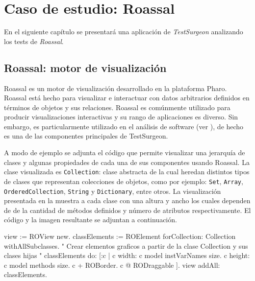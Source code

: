 \chapter{Caso de estudio: Roassal}


\par En el siguiente capítulo se presentará una aplicación de \emph{TestSurgeon} analizando los tests de \emph{Roassal}. 

\section{Roassal: motor de visualización}

\par Roassal es un motor de visualización desarrollado en la plataforma Pharo. Roassal está hecho para visualizar e interactuar con datos arbitrarios definidos en términos de objetos y sus relaciones. Roassal es comúnmente utilizado para producir visualizaciones interactivas y su rango de aplicaciones es diverso. Sin embargo, es particularmente utilizado en el análisis de software (ver ), de hecho es una de las componentes principales de TestSurgeon.

\par A modo de ejemplo se adjunta el código que permite visualizar una jerarquía de clases y algunas propiedades de cada una de sus componentes usando Roassal. La clase visualizada es {\tt Collection}: clase abstracta de la cual heredan distintos tipos de clases que representan colecciones de objetos, como por ejemplo: {\tt Set}, {\tt Array}, {\tt OrderedCollection}, {\tt String} y {\tt Dictionary}, entre otros. La visualización presentada en la  muestra a cada clase con una altura y ancho los cuales dependen de de la cantidad de métodos definidos y número de atributos respectivamente. El código y la imagen resultante se adjuntan a continuación.\\

\begin{code}
view := ROView new.
classElements := ROElement forCollection:
	Collection withAllSubclasses.
" Crear elementos graficos a partir de la clase Collection y sus clases hijas "
classElements
	do: [:c |
		c width: c model instVarNames size.
		c height: c model methods size.
		c + ROBorder.
		c @ RODraggable ].
view addAll: classElements.
\end{code}

